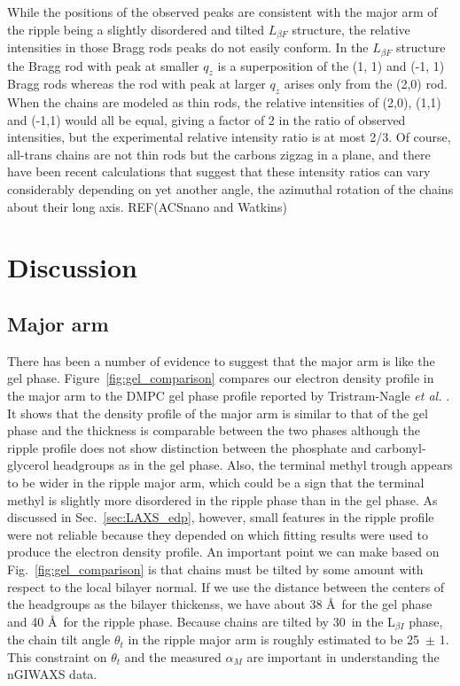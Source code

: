 While the positions of the observed peaks are consistent
with the major arm of the ripple being a slightly disordered and tilted $L_{\beta F}$ structure, 
the relative intensities in those Bragg rods peaks do not easily conform. In the $L_{\beta F}$ structure the Bragg rod with peak at smaller $q_z$ is a superposition of the (1, 1) and (-1, 1) Bragg rods whereas the rod with peak at larger $q_z$ arises only from the (2,0) rod.  When the chains are modeled as thin rods, the relative intensities 
of (2,0), (1,1) and (-1,1) would all be equal, giving a factor of 2 in the ratio of observed intensities, but the experimental relative intensity ratio is at most 2/3. Of course, all-trans chains are not thin rods but the carbons zigzag in a plane, and there have been recent calculations that suggest that these intensity ratios can vary considerably depending on yet another angle, the azimuthal rotation of the chains about their long axis. REF(ACSnano and Watkins)

\newpage
\section{Discussion}\label{sec:ripple_discussion}
\subsection{Major arm}
There has been a number of evidence to suggest that the major arm is like 
the gel phase. Figure~\ref{fig:gel_comparison} compares our electron density
profile in the major arm to the DMPC gel phase profile reported by 
Tristram-Nagle \textit{et al.} \cite{Tristram-Nagle02}. 
It shows that the density profile of the major arm is similar to that 
of the gel phase and the thickness is comparable between the two phases
although the ripple profile does not show distinction
between the phosphate and carbonyl-glycerol headgroups as in the gel phase.
Also, the terminal methyl trough appears to be wider in the ripple major arm,
which could be a sign that the terminal methyl is slightly more disordered
in the ripple phase than in the gel phase.
As discussed in
Sec.~\ref{sec:LAXS_edp}, however, small features in the ripple profile were not
reliable because they depended on which fitting results were used
to produce the electron density profile.
An important point we can make based on Fig.~\ref{fig:gel_comparison} 
is that chains must be tilted by some amount with respect to the local bilayer
normal. If we use the distance between the centers of the headgroups as the
bilayer thickenss, we have about 38 \AA\ for the gel phase and 40 \AA\
for the ripple phase. Because chains are tilted by 30\textdegree\ in the 
L$_{\beta I}$ phase, the chain tilt angle $\theta_t$ in the ripple major 
arm is roughly estimated to be 25\textdegree\ $\pm$ 1\textdegree. This constraint on $\theta_t$
and the measured $\alpha_M$ are important in understanding the nGIWAXS data.

